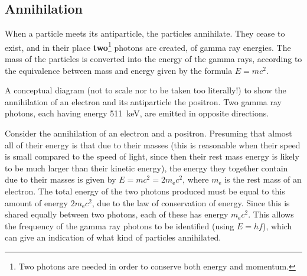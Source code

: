 
\subsection{Annihilation}

When a particle meets its antiparticle, the particles annihilate.  They cease to exist, and in their place {\bf two}\footnote{Two photons are needed in order to conserve both energy and momentum.} photons are created, of gamma ray energies.  The mass of the particles is converted into the energy of the gamma rays, according to the equivalence between mass and energy given by the formula $E=mc^{2}$.

\begin{marginfigure}
\caption{A conceptual diagram (not to scale nor to be taken too literally!) to show the annihilation of an electron and its antiparticle the positron.  Two gamma ray photons, each having energy \SI{511}{keV}, are emitted in opposite directions.}
\end{marginfigure}

Consider the annihilation of an electron and a positron.  Presuming that almost all of their energy is that due to their masses (this is reasonable when their speed is small compared to the speed of light, since then their rest mass energy is likely to be much larger than their kinetic energy), the energy they together contain due to their masses is given by $E=mc^{2}=2m_{\mathrm{e}}c^{2}$, where $m_{\mathrm{e}}$ is the rest mass of an electron.  The total energy of the two photons produced must be equal to this amount of energy $2m_{\mathrm{e}}c^{2}$, due to the law of conservation of energy. Since this is shared equally between two photons, each of these has energy $m_{\mathrm{e}}c^{2}$.  This allows the frequency of the gamma ray photons to be identified (using $E=hf$), which can give an indication of what kind of particles annihilated.

